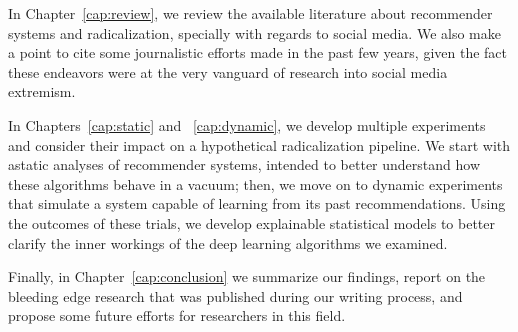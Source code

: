 In Chapter~\ref{cap:review}, we review the available literature about
recommender systems and radicalization, specially with regards to social media.
We also make a point to cite some journalistic efforts made in the past few
years, given the fact these endeavors were at the very vanguard of research into
social media extremism.

In Chapters~\ref{cap:static} and ~\ref{cap:dynamic}, we develop multiple
experiments and consider their impact on a hypothetical radicalization pipeline.
We start with astatic analyses of recommender systems, intended to better
understand how these algorithms behave in a vacuum; then, we move on to dynamic
experiments that simulate a system capable of learning from its past
recommendations. Using the outcomes of these trials, we develop explainable
statistical models to better clarify the inner workings of the deep learning
algorithms we examined.

Finally, in Chapter~\ref{cap:conclusion} we summarize our findings, report on
the bleeding edge research that was published during our writing process, and
propose some future efforts for researchers in this field.
